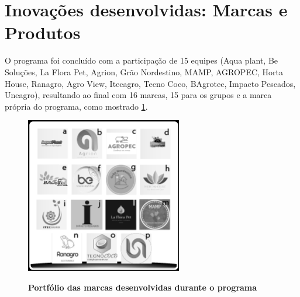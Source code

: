 \section{Inovações desenvolvidas: Marcas e Produtos}
\label{inovacoes}

O programa foi concluído  com a participação de 15 equipes (Aqua plant, Be Soluções, La Flora Pet, Agrion, Grão Nordestino, MAMP, AGROPEC, Horta House, Ranagro, Agro View, Itecagro, Tecno Coco, BAgrotec, Impacto Pescados, Uneagro), resultando ao final com 16 marcas, 15 para os grupos e a marca própria do programa, como mostrado  \ref{figura_12}.




\begin{figure}[H]
\centering
\caption{\textbf{Portfólio das marcas desenvolvidas durante o programa}}
\includegraphics[scale=1]{Imagens/portfolio.png}
\label{figura_12}
\end{figure}


